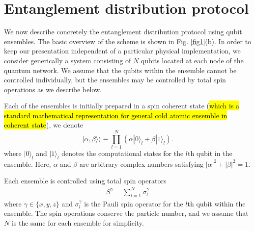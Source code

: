 \documentclass[%
  prx,%
  twocolumn,%
  preprintnumbers,%
  amsmath,%
  amssymb,%
  superscriptaddress%
]{revtex4}
\begin{document}
\section{Entanglement distribution protocol}

We now describe concretely the entanglement distribution protocol using qubit ensembles. The basic overview of the scheme is shown in Fig. \ref{fig1}(b).  In order to keep our presentation independent of a particular physical implementation, we consider generically a system consisting of $ N $ qubits located at each node of the quantum network.  We assume that the qubits within the ensemble cannot be controlled individually, but the ensembles may be controlled by total spin operations as we describe below.

Each of the ensembles is initially prepared in a spin coherent state (\hl{which is a standard mathematical representation for general cold atomic ensemble in coherent state}), we denote
%
\begin{equation}
\label{ensemblequbit}
|\alpha,\beta\rangle\rangle\equiv \prod_{l=1}^N (\alpha |0\rangle_l +\beta |1 \rangle_l).
\end{equation}
%
where $ |0\rangle_l $ and $ |1\rangle_l $ denotes the computational states for the $l$th qubit in the ensemble.  Here, $\alpha$ and $\beta$ are arbitrary complex numbers satisfying $|\alpha|^2+|\beta|^2=1$.

Each ensemble is controlled using total spin operators
%
\begin{align}
S^\gamma = \sum_{l=1}^N \sigma_l^\gamma
\end{align}
%
where $\gamma \in\{ x, y, z \} $ and $ \sigma_l^\gamma $ is the Pauli spin operator for the $ l $th qubit within the ensemble.  The spin operations conserve the particle number, and we assume that $ N $ is the same for each ensemble for simplicity.
\end{document}

